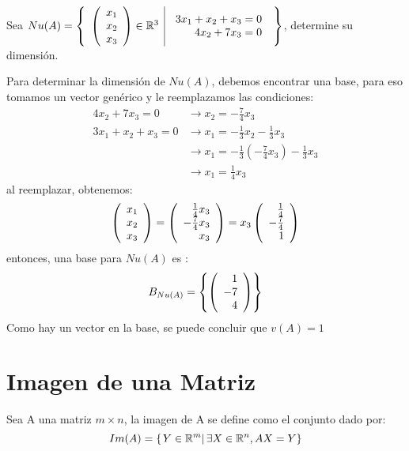 \begin{ejemplo}
Sea $Nu(A)= \left\{\begin{array}{c|c} {\left( \begin{array}{c} x_1\\ x_2\\ x_3 \end{array}\right) \in \mathbb{R}^3 }&{\begin{array}{r}
    3x_1 + x_2 + x_3 = 0  \\
    4x_2 + 7x_3 = 0 
\end{array}} \end{array} \right\}$, determine su dimensión.
\end{ejemplo}
\sol 
Para determinar la dimensión de $Nu(A)$, debemos encontrar una base, para eso tomamos un vector genérico y le reemplazamos las condiciones:
\begin{align*}
    4x_2 + 7x_3 = 0 &\rightarrow x_2 = -\frac{7}{4}x_3\\
    3x_1 + x_2 + x_3 = 0 &\rightarrow x_1 = -\frac{1}{3} x_2 - \frac{1}{3}x_3\\ &\rightarrow x_1 = -\frac{1}{3}\left(-\frac{7}{4}x_3 \right) - \frac{1}{3}x_3\\
    &\rightarrow x_1 = \frac{1}{4}x_3
\end{align*}
al reemplazar, obtenemos:
\[ \left( \begin{array}{r} x_1\\ x_2\\ x_3 \end{array} \right)  = \left( \begin{array}{r} \frac{1}{4}x_3\\ -\frac{7}{4}x_3\\ x_3 \end{array} \right)   = x_3\left( \begin{array}{r} \frac{1}{4}\\ -\frac{7}{4}\\ 1 \end{array} \right) \]
entonces, una base para $Nu(A)$ es :
$$B_{Nu(A)} =  \left\{\left( \begin{array}{r} 1\\ -7\\ 4 \end{array} \right)  \right\} $$
Como hay un vector en la base, se puede concluir que $v(A) = 1$



\newpage
\section{Imagen de una Matriz}
\begin{dfn}
Sea A una matriz $m\times n$, la imagen de A se define como el conjunto dado por:
~\\
\[Im(A)=\left\{ \left. Y \in \mathbb{R}^m \right| \exists X \in \mathbb{R}^n,   AX=Y \right\}\]
\end{dfn}

